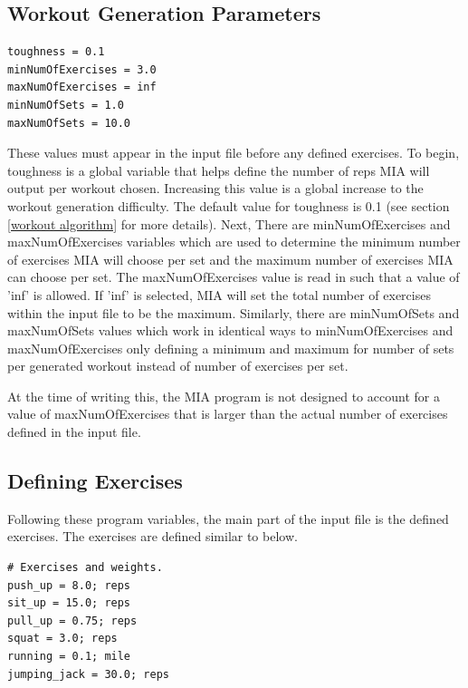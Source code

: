 \subsection{Workout Generation Parameters}

\begin{lstlisting}[style=pythonstyle]
toughness = 0.1
minNumOfExercises = 3.0
maxNumOfExercises = inf
minNumOfSets = 1.0
maxNumOfSets = 10.0
\end{lstlisting}

These values must appear in the input file before any defined exercises. To begin, toughness is a global variable that helps define the number of reps MIA will output per workout chosen. Increasing this value is a global increase to the workout generation difficulty. The default value for toughness is 0.1 (see section \ref{workout algorithm} for more details). Next, There are minNumOfExercises and maxNumOfExercises variables which are used to determine the minimum number of exercises MIA will choose per set and the maximum number of exercises MIA can choose per set. The maxNumOfExercises value is read in such that a value of 'inf' is allowed. If 'inf' is selected, MIA will set the total number of exercises within the input file to be the maximum. Similarly, there are minNumOfSets and maxNumOfSets values which work in identical ways to minNumOfExercises and maxNumOfExercises only defining a minimum and maximum for number of sets per generated workout instead of number of exercises per set. 

\begin{note}
	At the time of writing this, the MIA program is not designed to account for a value of maxNumOfExercises that is larger than the actual number of exercises defined in the input file.
\end{note}

\subsection{Defining Exercises}

Following these program variables, the main part of the input file is the defined exercises. The exercises are defined similar to below.

\begin{lstlisting}[style=pythonstyle]
# Exercises and weights.
push_up = 8.0; reps
sit_up = 15.0; reps
pull_up = 0.75; reps
squat = 3.0; reps
running = 0.1; mile
jumping_jack = 30.0; reps
\end{lstlisting}

